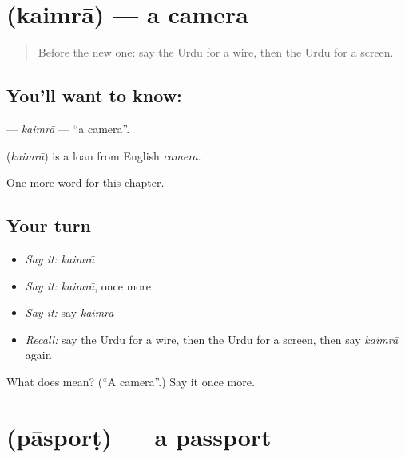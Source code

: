 \section[\texorpdfstring{\ur{کیمرہ} (kaimrā)}{کیمرہ (kaimrā)}]{ (kaimrā) — a camera}

\label{lesson:UR-C198-kaimra}



\begin{quote}
Before the new one: say the Urdu for a wire, then the Urdu for a screen.
\end{quote}

\subsection*{You'll want to know: }
\textbf{} — \emph{kaimrā} — \textquotedblleft{}a camera\textquotedblright{}.

\begin{cousinweb}
\textbf{} (\emph{kaimrā}) is a loan from English \emph{camera}.
\end{cousinweb}

\begin{grammarlens}[title={What you've built}]
One more word for this chapter.
\end{grammarlens}

\subsection*{Your turn}
\begin{itemize}
\raggedright
  \item \emph{Say it:} \emph{kaimrā}
  \item \emph{Say it:} \emph{kaimrā}, once more
  \item \emph{Say it:} say \emph{kaimrā}
  \item \emph{Recall:} say the Urdu for a wire, then the Urdu for a screen, then say \emph{kaimrā} again
\end{itemize}

\begin{tcolorbox}[breakable,colback=teal!4,colframe=teal!35!black,title={Before you move on}]
What does  mean? (\textquotedblleft{}A camera\textquotedblright{}.) Say it once more.
\end{tcolorbox}
\section[\texorpdfstring{\ur{پاسپورٹ} (pāsporṭ)}{پاسپورٹ (pāsporṭ)}]{ (pāsporṭ) — a passport}

